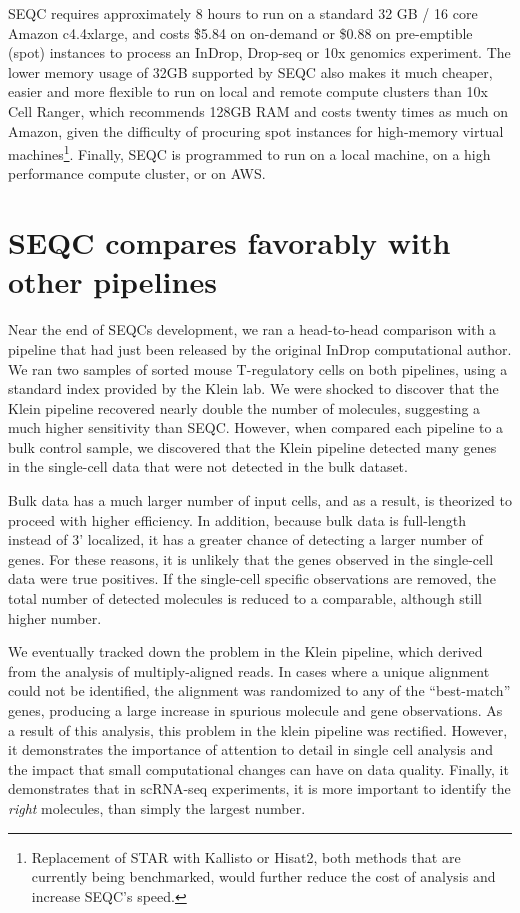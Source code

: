 SEQC requires approximately 8 hours to run on a standard 32 GB / 16 core Amazon c4.4xlarge, and costs \$5.84 on on-demand or \$0.88 on pre-emptible (spot) instances to process an InDrop, Drop-seq or 10x genomics experiment.
The lower memory usage of 32GB supported by SEQC also makes it much cheaper, easier and more flexible to run on local and remote compute clusters than 10x Cell Ranger, which recommends 128GB RAM and costs twenty times as much on Amazon, given the difficulty of procuring spot instances for high-memory virtual machines\footnote{Replacement of STAR with Kallisto or Hisat2, both methods that are currently being benchmarked, would further reduce the cost of analysis and increase SEQC's speed.}. 
Finally, SEQC is programmed to run on a local machine, on a high performance compute cluster, or on AWS. 

\section{SEQC compares favorably with other pipelines}

Near the end of SEQCs development, we ran a head-to-head comparison with a pipeline that had just been released by the original InDrop computational author. 
We ran two samples of sorted mouse T-regulatory cells on both pipelines, using a standard index provided by the Klein lab. 
We were shocked to discover that the Klein pipeline recovered nearly double the number of molecules, suggesting a much higher sensitivity than SEQC\@.
However, when compared each pipeline to a bulk control sample, we discovered that the Klein pipeline detected many genes in the single-cell data that were not detected in the bulk dataset. 

Bulk data has a much larger number of input cells, and as a result, is theorized to proceed with higher efficiency. 
In addition, because bulk data is full-length instead of 3' localized, it has a greater chance of detecting a larger number of genes. 
For these reasons, it is unlikely that the genes observed in the single-cell data were true positives.
If the single-cell specific observations are removed, the total number of detected molecules is reduced to a comparable, although still higher number. 

We eventually tracked down the problem in the Klein pipeline, which derived from the analysis of multiply-aligned reads. In cases where a unique alignment could not be identified, the alignment was randomized to any of the ``best-match'' genes, producing a large increase in spurious molecule and gene observations. 
As a result of this analysis, this problem in the klein pipeline was rectified. 
However, it demonstrates the importance of attention to detail in single cell analysis and the impact that small computational changes can have on data quality. 
Finally, it demonstrates that in scRNA-seq experiments, it is more important to identify the \textit{right} molecules, than simply the largest number. 


